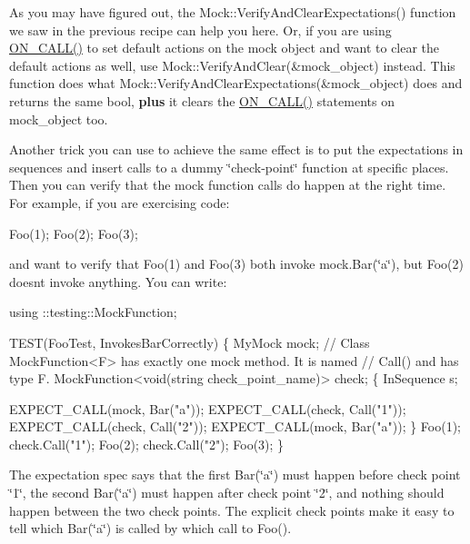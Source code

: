 As you may have figured out, the {\ttfamily Mock\+::\+Verify\+And\+Clear\+Expectations()} function we saw in the previous recipe can help you here. Or, if you are using {\ttfamily \hyperlink{gmock-spec-builders_8h_a5b12ae6cf84f0a544ca811b380c37334}{O\+N\+\_\+\+C\+A\+L\+L()}} to set default actions on the mock object and want to clear the default actions as well, use {\ttfamily Mock\+::\+Verify\+And\+Clear(\&mock\+\_\+object)} instead. This function does what {\ttfamily Mock\+::\+Verify\+And\+Clear\+Expectations(\&mock\+\_\+object)} does and returns the same {\ttfamily bool}, {\bfseries plus} it clears the {\ttfamily \hyperlink{gmock-spec-builders_8h_a5b12ae6cf84f0a544ca811b380c37334}{O\+N\+\_\+\+C\+A\+L\+L()}} statements on {\ttfamily mock\+\_\+object} too.

Another trick you can use to achieve the same effect is to put the expectations in sequences and insert calls to a dummy \char`\"{}check-\/point\char`\"{} function at specific places. Then you can verify that the mock function calls do happen at the right time. For example, if you are exercising code\+:


\begin{DoxyCode}
Foo(1);
Foo(2);
Foo(3);
\end{DoxyCode}


and want to verify that {\ttfamily Foo(1)} and {\ttfamily Foo(3)} both invoke {\ttfamily mock.\+Bar(\char`\"{}a\char`\"{})}, but {\ttfamily Foo(2)} doesn\textquotesingle{}t invoke anything. You can write\+:


\begin{DoxyCode}
using ::testing::MockFunction;

TEST(FooTest, InvokesBarCorrectly) \{
  MyMock mock;
  // Class MockFunction<F> has exactly one mock method.  It is named
  // Call() and has type F.
  MockFunction<void(string check\_point\_name)> check;
  \{
    InSequence s;

    EXPECT\_CALL(mock, Bar("a"));
    EXPECT\_CALL(check, Call("1"));
    EXPECT\_CALL(check, Call("2"));
    EXPECT\_CALL(mock, Bar("a"));
  \}
  Foo(1);
  check.Call("1");
  Foo(2);
  check.Call("2");
  Foo(3);
\}
\end{DoxyCode}


The expectation spec says that the first {\ttfamily Bar(\char`\"{}a\char`\"{})} must happen before check point \char`\"{}1\char`\"{}, the second {\ttfamily Bar(\char`\"{}a\char`\"{})} must happen after check point \char`\"{}2\char`\"{}, and nothing should happen between the two check points. The explicit check points make it easy to tell which {\ttfamily Bar(\char`\"{}a\char`\"{})} is called by which call to {\ttfamily Foo()}.

